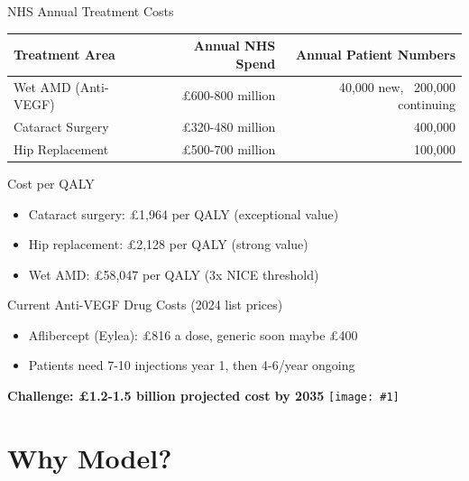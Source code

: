 \documentclass[10pt,aspectratio=169]{beamer}
\newcommand{\apewatermark}[1]{%
    \vspace*{\fill}
    \hfill
    \texttt{[image: \#1]}
    \hspace{0.5cm}
    \vspace{0.5cm}
}
\begin{document}
\begin{frame}{NHS Annual Treatment Costs}
\begin{table}
\centering
\begin{tabular}{lrr}
\toprule
Treatment Area & Annual NHS Spend & Annual Patient Numbers \\
\midrule
\alert{Wet AMD (Anti-VEGF)} & \alert{£600-800 million} & 40,000 new, ~200,000 continuing \\
Cataract Surgery & £320-480 million & 400,000 \\
Hip Replacement & £500-700 million & 100,000 \\
\bottomrule
\end{tabular}
\end{table}

\vspace{0.3cm}
\begin{alertblock}{Cost per QALY}
\begin{itemize}
    \item Cataract surgery: £1,964 per QALY (exceptional value)
    \item Hip replacement: £2,128 per QALY (strong value)
    \item \alert{Wet AMD: £58,047 per QALY (3x NICE threshold)}
\end{itemize}
\end{alertblock}

\begin{block}{Current Anti-VEGF Drug Costs (2024 list prices)}
\begin{itemize}
    \item Aflibercept (Eylea): £816 a dose, generic soon maybe £400
    \item Patients need 7-10 injections year 1, then 4-6/year ongoing
\end{itemize}
\end{block}

\centering
\textbf{Challenge: £1.2-1.5 billion projected cost by 2035}
\apewatermark{sad_ape_watermark.png}
\end{frame}

\section{Why Model?}
\end{document}

